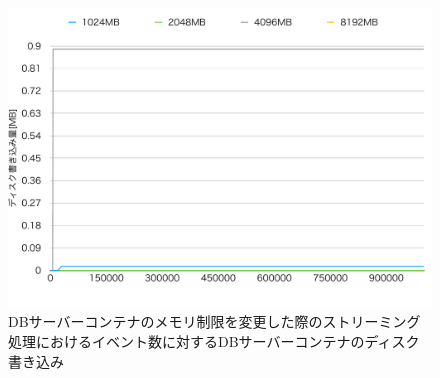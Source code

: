 \documentclass[../../../../../main]{subfiles}
\begin{document}
    \begin{figure}[H]
        \centering
        \includegraphics[width=12cm]{graph}
        \caption{DBサーバーコンテナのメモリ制限を変更した際のストリーミング処理におけるイベント数に対するDBサーバーコンテナのディスク書き込み}
        \label{fig:stream-change-db-memory-limit-db-disk-in-app_4_8192-db_400}
    \end{figure}
\end{document}
